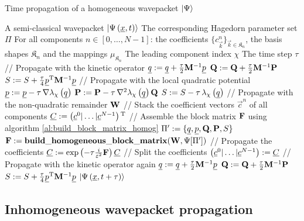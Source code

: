 \begin{algorithm}
\caption{Time propagation of a homogeneous wavepacket $\Ket{\Psi}$}
\label{al:tp_wave_packets_homog}
\begin{algorithmic}
  \REQUIRE A semi-classical wavepacket $\Ket{\Psi\left( \underline{x},t \right)}$
  \REQUIRE The corresponding Hagedorn parameter set $\Pi$
  \REQUIRE For all components $n \in [0, \ldots, N-1]$: the coefficients $\{c^n_{\vec{k}}\}_{\vec{k}\in\mathfrak{K}_n}$,
  \REQUIRE the basis shapes $\mathfrak{K}_n$ and the mappings $\mu_{\mathfrak{K}_n}$
  \REQUIRE The leading component index $\chi$
  \REQUIRE The time step $\tau$
  \STATE // Propagate with the kinetic operator
  \STATE $\underline{q} := \underline{q} + \frac{\tau}{2} \mathbf{M}{}^{-1} \underline{p}$
  \STATE $\mathbf{Q} := \mathbf{Q} + \frac{\tau}{2} \mathbf{M}{}^{-1} \mathbf{P}$
  \STATE $S := S + \frac{\tau}{4} \underline{p}{}^{\textnormal{T}} \mathbf{M}{}^{-1} \underline{p}$
  \STATE // Propagate with the local quadratic potential
  \STATE $\underline{p} := \underline{p} - \tau \, \nabla \lambda_\chi\left( \underline{q} \right)$
  \STATE $\mathbf{P} := \mathbf{P} - \tau \, \nabla^2 \lambda_\chi\left( \underline{q} \right) \mathbf{Q}$
  \STATE $S := S - \tau \, \lambda_\chi\left( \underline{q} \right)$
  \STATE // Propagate with the non-quadratic remainder $\mathbf{W}$
  \STATE // Stack the coefficient vectors $\vec{c}^n$ of all components
  \STATE $\underline{C} := \left(\underline{c}^0 | \hdots | \underline{c}^{N-1}\right){}^{\textnormal{T}}$
  \STATE // Assemble the block matrix $\mathbf{F}$ using algorithm \ref{al:build_block_matrix_homog}
  \STATE $\Pi^\prime := \{\underline{q}, \underline{p}, \mathbf{Q}, \mathbf{P}, S\}$
  \STATE $\mathbf{F} := \mathbf{build\_homogeneous\_block\_matrix}(\mathbf{W}, \Psi[\Pi^\prime])$
  \STATE // Propagate the coefficients
  \STATE $\underline{C} := \exp\left( -\tau \frac{i}{\varepsilon^2} \mathbf{F} \right) \underline{C}$
  \STATE // Split the coefficients
  \STATE $\left(\underline{c}^0 | \ldots | \underline{c}^{N-1}\right) := \underline{C}$
  \STATE // Propagate with the kinetic operator again
  \STATE $\underline{q} := \underline{q} + \frac{\tau}{2} \mathbf{M}{}^{-1} \underline{p}$
  \STATE $\mathbf{Q} := \mathbf{Q} + \frac{\tau}{2} \mathbf{M}{}^{-1} \mathbf{P}$
  \STATE $S := S + \frac{\tau}{4} \underline{p}{}^{\textnormal{T}} \mathbf{M}{}^{-1} \underline{p}$
  \RETURN $\Ket{\Psi\left( \underline{x}, t+\tau \right)}$
\end{algorithmic}
\end{algorithm}


\subsection{Inhomogeneous wavepacket propagation}


